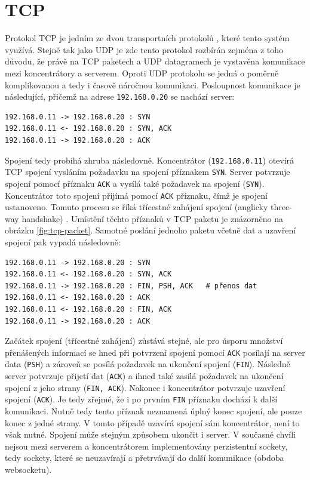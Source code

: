 \section{TCP}
Protokol TCP  je jedním ze dvou transportních protokolů \cite{mistrovstvi}, které tento systém využívá. Stejně tak jako UDP je zde tento protokol rozbírán zejména z toho důvodu, že právě na TCP paketech a UDP datagramech je vystavěna komunikace mezi koncentrátory a serverem. Oproti UDP protokolu se jedná o poměrně komplikovanou a tedy i časově náročnou komunikaci. Posloupnost komunikace je následující, přičemž na adrese \texttt{192.168.0.20} se  nachází server:

\begin{verbatim}
192.168.0.11 -> 192.168.0.20 : SYN
192.168.0.11 <- 192.168.0.20 : SYN, ACK
192.168.0.11 -> 192.168.0.20 : ACK
\end{verbatim}

Spojení tedy probíhá zhruba následovně. Koncentrátor (\texttt{192.168.0.11}) otevírá TCP spojení vysláním požadavku na spojení příznakem \texttt{SYN}. Server potvrzuje spojení pomocí příznaku \texttt{ACK} a vysílá také požadavek na spojení (\texttt{SYN}). Koncentrátor toto spojení přijímá pomocí \texttt{ACK} příznaku, čímž je spojení ustanoveno. Tomuto procesu se říká třícestné zahájení spojení (anglicky three-way handshake) \cite{mistrovstvi}. Umístění těchto příznaků v TCP paketu je znázorněno na obrázku \ref{fig:tcp-packet}. Samotné poslání jednoho paketu včetně dat a uzavření spojení pak vypadá následovně:

\begin{verbatim}
192.168.0.11 -> 192.168.0.20 : SYN
192.168.0.11 <- 192.168.0.20 : SYN, ACK
192.168.0.11 -> 192.168.0.20 : FIN, PSH, ACK   # přenos dat
192.168.0.11 <- 192.168.0.20 : ACK
192.168.0.11 <- 192.168.0.20 : FIN, ACK
192.168.0.11 -> 192.168.0.20 : ACK
\end{verbatim}

Začátek spojení (třícestné zahájení) zůstává stejné, ale pro úsporu množ\-ství přenášených informací se hned při potvrzení spojení pomocí \texttt{ACK} posílají na server data (\texttt{PSH}) a zároveň se posílá požadavek na ukončení spojení (\texttt{FIN}). Následně server potvrzuje přijetí dat (\texttt{ACK}) a ihned také zasílá požadavek na ukončení spojení z jeho strany (\texttt{FIN, ACK}). Nakonec i koncentrátor potvrzuje uzavření spojení (\texttt{ACK}). Je tedy zřejmé, že i po prvním \texttt{FIN} příznaku dochází k další komunikaci. Nutně tedy tento příznak neznamená úplný konec spojení, ale pouze konec z jedné strany. V tomto případě uzavírá spojení sám koncentrátor, není to však nutné. Spojení může stejným způsobem ukončit i server. V současné chvíli nejsou mezi serverem a koncentrátorem implementovány perzistentní sockety, tedy sockety, které se neuzavírají a přetrvávají do další komunikace (obdoba websocketu).

